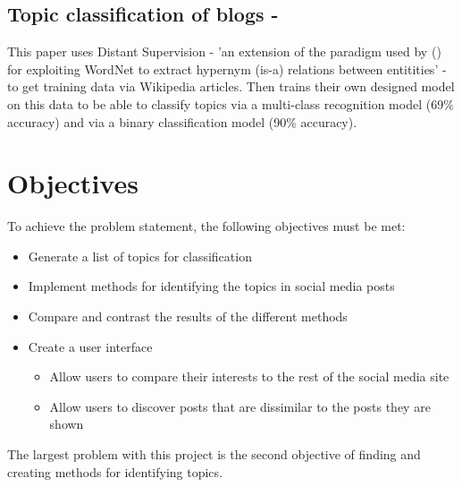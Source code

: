 \subsection{Topic classification of blogs - \cite{husby2012topic}}
This paper uses Distant Supervision - 'an extension of the paradigm used by (\cite{snow}) for exploiting WordNet to extract hypernym (is-a) relations between entitities'
- to get training data via Wikipedia articles. Then trains their own designed model on this data to be able to classify topics via a
multi-class recognition model (69\% accuracy) and via a binary classification model (90\% accuracy).

\section{Objectives}
To achieve the problem statement, the following objectives must be met:
\begin{itemize}
    \item Generate a list of topics for classification
    \item Implement methods for identifying the topics in social media posts
    \item Compare and contrast the results of the different methods
    \item Create a user interface
    \begin {itemize}
        \item Allow users to compare their interests to the rest of the social media site
        \item Allow users to discover posts that are dissimilar to the posts they are shown
    \end{itemize}
\end{itemize}
The largest problem with this project is the second objective of finding and creating methods for identifying topics.
